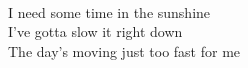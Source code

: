 \\
I need some time in the sunshine \\
I've gotta slow it right down \\
The day's moving just too fast for me \\
